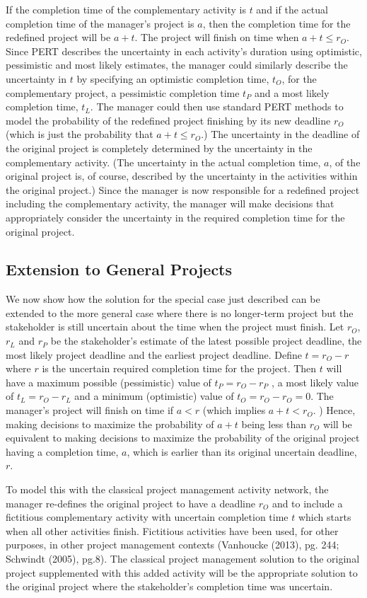 \documentclass[11pt]{article}
\begin{document}
          If the completion time of the complementary activity is $t$ and if the actual completion time of the manager's project is $a$, then the completion time for the redefined project will be $a+t$.   The project will finish on time when $a+t \leq r_O$.   Since PERT describes the uncertainty in each activity's duration using optimistic, pessimistic and most likely estimates, the manager could similarly describe the uncertainty in $t$ by specifying an optimistic completion time, $t_O$, for the complementary project, a pessimistic completion time $t_P$  and a most likely completion time, $t_L$.  The manager could then use standard PERT methods to model the probability of the redefined project finishing by its new deadline $r_O$ (which is just the probability that $a+t \leq r_O$.)   The uncertainty in the deadline of the original project is completely determined by the uncertainty in the complementary activity.   (The uncertainty in the actual completion time, $a$, of the original project is, of course, described by the uncertainty in the activities within the original project.)  Since the manager is now responsible for a redefined project including the complementary activity, the manager will make decisions that appropriately consider the uncertainty in the required completion time for the original project.
\subsection{Extension to General Projects}
          We now show how the solution for the special case just described can be extended to the more general case where there is no longer-term project but the stakeholder is still uncertain about the time when the project must finish.  Let $r_O$, $r_L$ and $r_P$ be the stakeholder's estimate of the latest possible project deadline, the most likely project deadline and the earliest project deadline.  Define $t=r_O-r$ where $r$ is the uncertain required completion time for the project.  Then $t$ will have a maximum possible (pessimistic) value of  $t_P = r_O-r_P$ , a most likely value of  $t_L = r_O-r_L$ and a minimum (optimistic) value of   $t_O = r_O-r_O=0$.  The manager's project will finish on time if $a < r $ (which implies $a+t < r_O$. )  Hence, making decisions to maximize the probability of $a+t$ being less than $r_O$ will be equivalent to making decisions to maximize the probability of the original project having a completion time, $a$, which is earlier than its original uncertain deadline, $r$.  \par
          To model this with the classical project management activity network, the manager re-defines the original project to have a deadline $r_O$ and to include a fictitious complementary activity with uncertain completion time $t$ which starts when all other activities finish.   Fictitious activities have been used, for other purposes, in other project management contexts (Vanhoucke (2013), pg. 244; Schwindt (2005), pg.8).  The classical project management solution to the original project supplemented with this added activity will be the appropriate solution to the original project where the stakeholder's completion time was uncertain.\par
\end{document}
